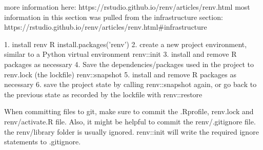 more information here: https://rstudio.github.io/renv/articles/renv.html
most information in this section was pulled from the infrastructure section: https://rstudio.github.io/renv/articles/renv.html#infrastructure

1. install renv
    R
    install.packages('renv')
2. create a new project environment, similar to a Python virtual environment
    renv::init
3. install and remove R packages as necessary
4. Save the dependencies/packages used in the project to renv.lock (the lockfile)
    renv::snapshot
5. install and remove R packages as necessary
6. save the project state by calling renv::snapshot again, or go back to the previous state as recorded
   by the lockfile with renv::restore

When committing files to git, make sure to commit the .Rprofile, renv.lock and renv/activate.R file.
Also, it might be helpful to commit the renv/.gitignore file.
the renv/library folder is usually ignored. renv::init will write the required ignore statements to .gitignore.
